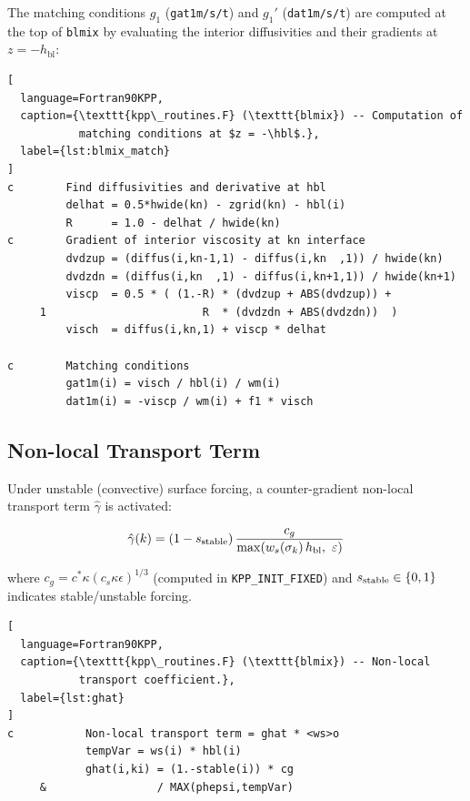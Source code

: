 \documentclass[12pt,letterpaper]{article}
\newcommand{\hbl}{h_{\mathrm{bl}}}
\newcommand{\ghat}{\hat{\gamma}}
\begin{document}
The matching conditions $g_1$ (\texttt{gat1m/s/t}) and $g_1'$  
(\texttt{dat1m/s/t}) are computed at the top of \texttt{blmix} by  
evaluating the interior diffusivities and their gradients at $z = -\hbl$:  
  
\begin{lstlisting}[  
  language=Fortran90KPP,  
  caption={\texttt{kpp\_routines.F} (\texttt{blmix}) -- Computation of  
           matching conditions at $z = -\hbl$.},  
  label={lst:blmix_match}  
]  
c        Find diffusivities and derivative at hbl  
         delhat = 0.5*hwide(kn) - zgrid(kn) - hbl(i)  
         R      = 1.0 - delhat / hwide(kn)  
c        Gradient of interior viscosity at kn interface  
         dvdzup = (diffus(i,kn-1,1) - diffus(i,kn  ,1)) / hwide(kn)  
         dvdzdn = (diffus(i,kn  ,1) - diffus(i,kn+1,1)) / hwide(kn+1)  
         viscp  = 0.5 * ( (1.-R) * (dvdzup + ABS(dvdzup)) +  
     1                        R  * (dvdzdn + ABS(dvdzdn))  )  
         visch  = diffus(i,kn,1) + viscp * delhat  
  
c        Matching conditions  
         gat1m(i) = visch / hbl(i) / wm(i)  
         dat1m(i) = -viscp / wm(i) + f1 * visch  
\end{lstlisting}  
  
\subsection{Non-local Transport Term}  
  
Under unstable (convective) surface forcing, a counter-gradient  
non-local transport term $\ghat$ is activated:  
  
\begin{equation}  
\ghat(k) = (1 - s_{\rm stable})\,\frac{c_g}  
            {\max(w_s(\sigma_k)\,\hbl,\ \varepsilon)}  
\end{equation}  
  
where $c_g = c^* \kappa (c_s \kappa \epsilon)^{1/3}$ (computed in  
\texttt{KPP\_INIT\_FIXED}) and $s_{\rm stable} \in \{0,1\}$ indicates  
stable/unstable forcing.  
  
\begin{lstlisting}[  
  language=Fortran90KPP,  
  caption={\texttt{kpp\_routines.F} (\texttt{blmix}) -- Non-local  
           transport coefficient.},  
  label={lst:ghat}  
]  
c           Non-local transport term = ghat * <ws>o  
            tempVar = ws(i) * hbl(i)  
            ghat(i,ki) = (1.-stable(i)) * cg  
     &                 / MAX(phepsi,tempVar)  
\end{lstlisting}  
  
\end{document}
